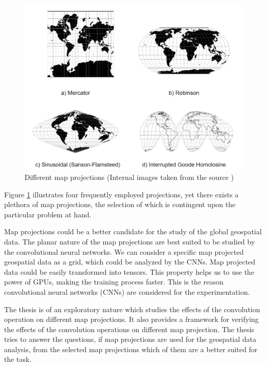 \begin{figure}[h]
    \centering
    \includegraphics[width=1.0\linewidth]{figures/chapter-1/multi_projections.png}
    \caption{Different map projections (Internal images taken from the source \cite{PROJ_SITE}) }
    \label{fig:multiple-projections}
\end{figure}

Figure \ref{fig:multiple-projections} illustrates four frequently employed projections, yet there exists a plethora of map projections, the selection of which is contingent
upon the particular problem at hand.

Map projections could be a better candidate for the study of the global geospatial data. The planar nature of the map projections are best suited to be studied by the
convolutional neural networks. We can consider a specific map projected geospatial data as a grid, which could be analyzed by the CNNs.
Map projected data could be easily transformed into tensors. This property helps us to use the power of GPUs, making the training process faster. This is the reason
convolutional neural networks (CNNs) are considered for the experimentation.

The thesis is of an exploratory nature which studies the effects of the convolution operation on different map projections. It also provides a framework for verifying
the effects of the convolution operations on different map projection.
The thesis tries to answer the questions, if map projections are used for the geospatial data analysis, from the selected map projections which of them are a better
suited for the task.

